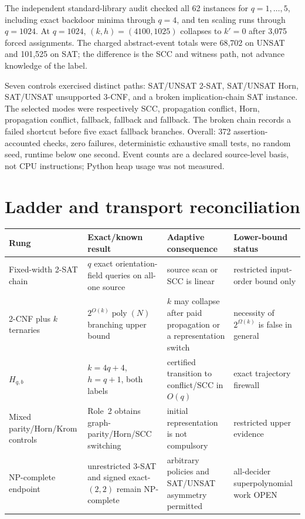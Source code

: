 \documentclass[11pt]{article}
\begin{document}
The independent standard-library audit checked all 62 instances for
$q=1,\ldots,5$, including exact backdoor minima through $q=4$, and ten
scaling runs through $q=1024$.  At $q=1024$, $(k,h)=(4100,1025)$ collapses to
$k'=0$ after 3,075 forced assignments.  The charged abstract-event totals
were 68,702 on UNSAT and 101,525 on SAT; the difference is the SCC and witness
path, not advance knowledge of the label.

Seven controls exercised distinct paths: SAT/UNSAT 2-SAT, SAT/UNSAT Horn,
SAT/UNSAT unsupported 3-CNF, and a broken implication-chain SAT instance.
The selected modes were respectively SCC, propagation conflict, Horn,
propagation conflict, fallback, fallback and fallback.  The broken chain
records a failed shortcut before five exact fallback branches.  Overall:
372 assertion-accounted checks, zero failures, deterministic exhaustive
small tests, no random seed, runtime below one second.  Event counts are a
declared source-level basis, not CPU instructions; Python heap usage was not
measured.

\section{Ladder and transport reconciliation}
\begin{center}\small
\begin{tabular}{p{.20\linewidth}p{.25\linewidth}p{.23\linewidth}p{.22\linewidth}}
\toprule
Rung & Exact/known result & Adaptive consequence & Lower-bound status\\\midrule
Fixed-width 2-SAT chain & $q$ exact orientation-field queries on all-one source & source scan or SCC is linear & restricted input-order bound only\\
2-CNF plus $k$ ternaries & $2^{O(k)}\operatorname{poly}(N)$ branching upper bound & $k$ may collapse after paid propagation or a representation switch & necessity of $2^{\Omega(k)}$ is false in general\\
$H_{q,b}$ & $k=4q+4$, $h=q+1$, both labels & certified transition to conflict/SCC in $O(q)$ & exact trajectory firewall\\
Mixed parity/Horn/Krom controls & Role~2 obtains graph-parity/Horn/SCC switching & initial representation is not compulsory & restricted upper evidence\\
NP-complete endpoint & unrestricted 3-SAT and signed exact-$(2,2)$ remain NP-complete & arbitrary policies and SAT/UNSAT asymmetry permitted & all-decider superpolynomial work OPEN\\
\bottomrule
\end{tabular}
\end{center}
\end{document}
